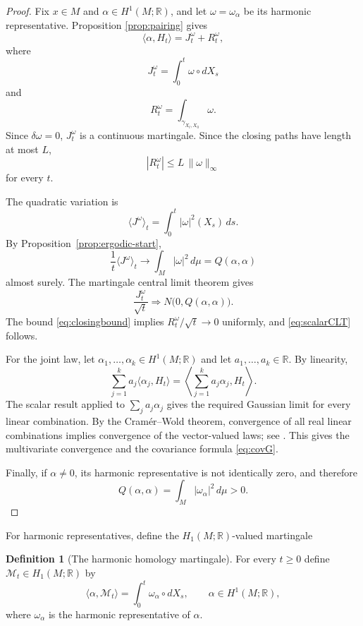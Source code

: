 \documentclass[a4paper,reqno]{amsart}
\newcommand{\R}{\mathbb R}
\theoremstyle{definition}
\newtheorem{definition}[theorem]{Definition}
\begin{document}
\begin{proof}
Fix $x\in M$ and $\alpha\in H^1(M;\R)$, and let $\omega=\omega_\alpha$ be its harmonic representative.  Proposition \ref{prop:pairing} gives
\begin{equation}\label{eq:decomp}
   \langle\alpha,H_t\rangle
   =J_t^\omega+R_t^\omega,
\end{equation}
where
\[
   J_t^\omega=\int_0^t\omega\circ dX_s
\]
and
\[
   R_t^\omega=\int_{\gamma_{X_t,X_0}}\omega.
\]
Since $\delta\omega=0$, $J_t^\omega$ is a continuous martingale.  Since the closing paths have length at most $L$,
\begin{equation}\label{eq:closingbound}
   |R_t^\omega|
   \le L\,\|\omega\|_\infty
\end{equation}
for every $t$.

The quadratic variation is
\[
   \langle J^\omega\rangle_t
   =\int_0^t|\omega|^2(X_s)\,ds.
\]
By Proposition~\ref{prop:ergodic-start},
\begin{equation}\label{eq:qvlimit}
   \frac{1}{t}\langle J^\omega\rangle_t
   \longrightarrow
   \int_M|\omega|^2\,d\mu
   =Q(\alpha,\alpha)
\end{equation}
almost surely.  The martingale central limit theorem gives
\[
   \frac{J_t^\omega}{\sqrt t}
   \Longrightarrow N\bigl(0,Q(\alpha,\alpha)\bigr).
\]
The bound \eqref{eq:closingbound} implies $R_t^\omega/\sqrt t\to0$ uniformly, and \eqref{eq:scalarCLT} follows.

For the joint law, let $\alpha_1,\ldots,\alpha_k\in H^1(M;\R)$ and let $a_1,\ldots,a_k\in\R$.  By linearity,
\[
  \sum_{j=1}^k a_j\langle\alpha_j,H_t\rangle
  =\left\langle\sum_{j=1}^k a_j\alpha_j,H_t\right\rangle.
\]
The scalar result applied to $\sum_j a_j\alpha_j$ gives the required Gaussian limit for every linear combination.  By the Cram\'er--Wold theorem, convergence of all real linear combinations implies convergence of the vector-valued laws; see \cite{Kallenberg}.  This gives the multivariate convergence and the covariance formula \eqref{eq:covG}.

Finally, if $\alpha\ne0$, its harmonic representative is not identically zero, and therefore
\[
   Q(\alpha,\alpha)=\int_M|\omega_\alpha|^2\,d\mu>0.
\]
\end{proof}

For harmonic representatives, define the $H_1(M;\R)$-valued martingale

\begin{definition}[The harmonic homology martingale]\label{def:harmonicmart}
For every $t\ge0$ define $\mathcal M_t\in H_1(M;\R)$ by
\begin{equation}\label{eq:harmonicmartdef}
   \langle\alpha,\mathcal M_t\rangle
   =\int_0^t\omega_\alpha\circ dX_s,
   \qquad \alpha\in H^1(M;\R),
\end{equation}
where $\omega_\alpha$ is the harmonic representative of $\alpha$.
\end{definition}
\end{document}

